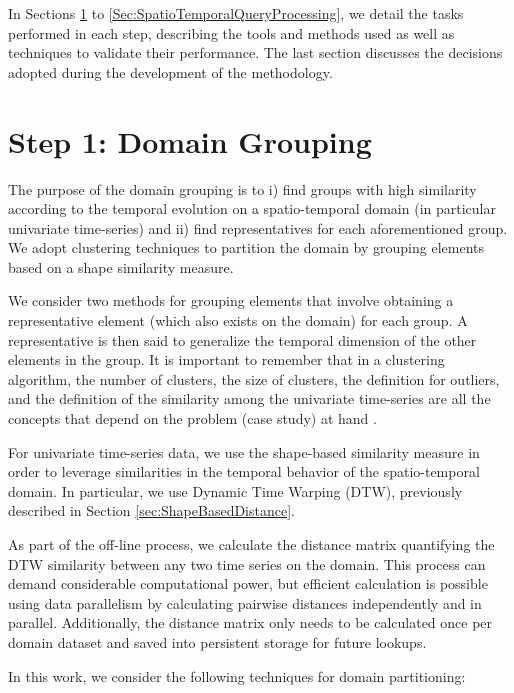 In Sections \ref{Sec:DomainPartitioning} to \ref{Sec:SpatioTemporalQueryProcessing}, we detail the tasks performed in each step, describing the tools and methods used as well as techniques to validate their performance. The last section discusses the decisions adopted during the development of the methodology.

\section{Step 1: Domain Grouping}
\label{Sec:DomainPartitioning}

The purpose of the domain grouping is to i) find groups with high similarity according to the temporal evolution on a spatio-temporal domain (in particular univariate time-series) and ii) find representatives for each aforementioned group. We adopt clustering techniques to partition the domain by grouping elements based on a shape similarity measure. 

We consider two methods for grouping elements that involve obtaining a representative element (which also exists on the domain) for each group. A representative is then said to generalize the temporal dimension of the other elements in the group. It is important to remember that in a clustering algorithm, the number of clusters, the size of clusters, the definition for outliers, and the definition of the similarity among the univariate time-series are all the concepts that depend on the problem (case study) at hand \cite{Aghabozorgi2015}.

For univariate time-series data, we use the shape-based similarity measure in order to leverage similarities in the temporal behavior of the spatio-temporal domain. In particular, we use Dynamic Time Warping (DTW), previously described in Section \ref{sec:ShapeBasedDistance}.

As part of the off-line process, we calculate the distance matrix quantifying the DTW similarity between any two time series on the domain. This process can demand considerable computational power, but efficient calculation is possible using data parallelism by calculating pairwise distances independently and in parallel. Additionally, the distance matrix only needs to be calculated once per domain dataset and saved into persistent storage for future lookups.

In this work, we consider the following techniques for domain partitioning:

